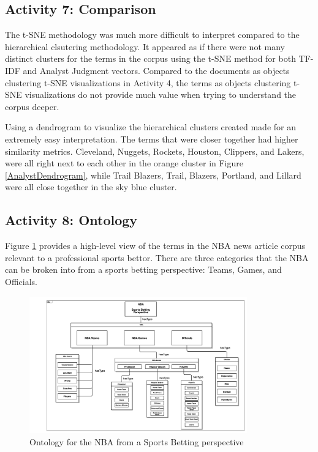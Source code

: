 \documentclass[5p,authoryear]{elsarticle}
\begin{document}
\subsection{Activity 7: Comparison}\label{one}

The t-SNE methodology was much more difficult to interpret compared to the hierarchical clsutering methodology. 
It appeared as if there were not many distinct clusters for the terms in the corpus using the t-SNE method for both TF-IDF and Analyst Judgment vectors.
Compared to the documents as objects clustering t-SNE visualizations in Activity 4, the terms as objects clustering t-SNE visualizations do not provide much value when trying to understand the corpus deeper.

Using a dendrogram to visualize the hierarchical clusters created made for an extremely easy interpretation. 
The terms that were closer together had higher similarity metrics. 
Cleveland, Nuggets, Rockets, Houston, Clippers, and Lakers, were all right next to each other in the orange cluster in Figure \ref{AnalystDendrogram}, while Trail Blazers, Trail, Blazers, Portland, and Lillard were all close together in the sky blue cluster.

\subsection{Activity 8: Ontology}\label{one}

Figure \ref{Ontology} provides a high-level view of the terms in the NBA news article corpus relevant to a professional sports bettor. 
There are three categories that the NBA can be broken into from a sports betting perspective: Teams, Games, and Officials. 


\begin{figure}[!htb] \centering
	\includegraphics[width=3.7in]{figures/Ontology.png}
	\caption[]{Ontology for the NBA from a Sports Betting perspective} 
	\label{Ontology} 
\end{figure}
\end{document}
